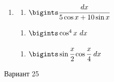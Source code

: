 \documentclass{article}
\begin{document}
\begin{multicols}{2}
\begin{enumerate}[label=\Roman*.]
	\item
	\begin{multicols}{3}
		\begin{enumerate}[label=\arabic*.]
			\setlength\itemsep{1em}
			\item $\bigints\cfrac{dx}{5\cos x + 10 \sin x}$
		\end{enumerate}
		\vfill\null\columnbreak
		\begin{enumerate}[label=\arabic*., start=2]
			\setlength\itemsep{1em}
			\item $\bigints\cos^4x\ dx$
		\end{enumerate}
		\vfill\null\columnbreak
		\begin{enumerate}[label=\arabic*., start=3]
			\setlength\itemsep{1em}
			\item $\bigints\sin\cfrac{x}{2}\cos\cfrac{x}{4}\ dx$
		\end{enumerate}
		\vfill\null\columnbreak
	\end{multicols}
\end{enumerate}

\vfill\null\columnbreak

\centerline{Вариант 25}


\end{multicols}
\end{document}
